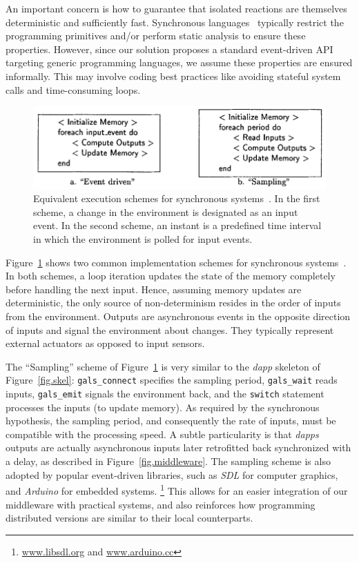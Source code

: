 \documentclass[sigplan,screen]{acmart}
\newcommand{\dapp}{\emph{dapp}\xspace}
\newcommand{\dapps}{\emph{dapps}\xspace}
\begin{document}
An important concern is how to guarantee that isolated reactions are themselves
deterministic and sufficiently fast.
Synchronous languages~\cite{langs} typically restrict the programming
primitives and/or perform static analysis to ensure these properties.
However, since our solution proposes a standard event-driven API targeting
generic programming languages, we assume these properties are ensured
informally.
This may involve coding best practices like avoiding stateful system calls and
time-consuming loops.

\begin{figure}[t]
  \centering
  \includegraphics[width=\linewidth]{schemes}
  \caption{
    \label{fig.schemes}
    Equivalent execution schemes for synchronous systems~\cite{schemes}.
    In the first scheme, a change in the environment is designated as an input
    event. 
    In the second scheme, an instant is a predefined time interval in which
    the environment is polled for input events.
  }
\end{figure}

Figure~\ref{fig.schemes} shows two common implementation schemes for
synchronous systems~\cite{schemes}.
In both schemes, a loop iteration updates the state of the memory completely
before handling the next input.
Hence, assuming memory updates are deterministic, the only source of
non-determinism resides in the order of inputs from the environment.
Outputs are asynchronous events in the opposite direction of inputs and
signal the environment about changes.
They typically represent external actuators as opposed to input sensors.

The ``Sampling'' scheme of Figure~\ref{fig.schemes} is very similar to the
\dapp skeleton of Figure~\ref{fig.skel}:
    \texttt{gals\_connect} specifies the sampling period,
    \texttt{gals\_wait} reads inputs,
    \texttt{gals\_emit} signals the environment back, and
    the \texttt{switch} statement processes the inputs (to update memory).
As required by the synchronous hypothesis, the sampling period, and
consequently the rate of inputs, must be compatible with the processing speed.
A subtle particularity is that \dapps outputs are actually asynchronous inputs
later retrofitted back synchronized with a delay, as described in
Figure~\ref{fig.middleware}.
%
The sampling scheme is also adopted by popular event-driven libraries, such as
\emph{SDL} for computer graphics, and \emph{Arduino} for embedded systems.%
\footnote{\url{www.libsdl.org} and \url{www.arduino.cc}}
This allows for an easier integration of our middleware with practical systems,
and also reinforces how programming distributed versions are similar to their
local counterparts.
\end{document}
